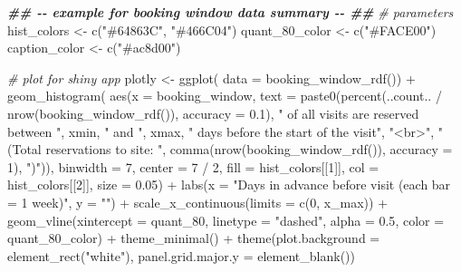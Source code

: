 \documentclass[
  11 pt,
  openany]{book}
\newenvironment{Shaded}{\begin{snugshade}}{\end{snugshade}}
\newcommand{\AttributeTok}[1]{\textcolor[rgb]{0.77,0.63,0.00}{#1}}
\newcommand{\CommentTok}[1]{\textcolor[rgb]{0.56,0.35,0.01}{\textit{#1}}}
\newcommand{\DecValTok}[1]{\textcolor[rgb]{0.00,0.00,0.81}{#1}}
\newcommand{\DocumentationTok}[1]{\textcolor[rgb]{0.56,0.35,0.01}{\textbf{\textit{#1}}}}
\newcommand{\FloatTok}[1]{\textcolor[rgb]{0.00,0.00,0.81}{#1}}
\newcommand{\FunctionTok}[1]{\textcolor[rgb]{0.00,0.00,0.00}{#1}}
\newcommand{\NormalTok}[1]{#1}
\newcommand{\OtherTok}[1]{\textcolor[rgb]{0.56,0.35,0.01}{#1}}
\newcommand{\SpecialCharTok}[1]{\textcolor[rgb]{0.00,0.00,0.00}{#1}}
\newcommand{\StringTok}[1]{\textcolor[rgb]{0.31,0.60,0.02}{#1}}
\begin{document}
\begin{Shaded}
\begin{Highlighting}[]
\DocumentationTok{\#\# {-}{-} example for booking window data summary {-}{-} \#\#}
\CommentTok{\# parameters}
\NormalTok{hist\_colors }\OtherTok{\textless{}{-}} \FunctionTok{c}\NormalTok{(}\StringTok{"\#64863C"}\NormalTok{, }\StringTok{"\#466C04"}\NormalTok{)}
\NormalTok{quant\_80\_color }\OtherTok{\textless{}{-}} \FunctionTok{c}\NormalTok{(}\StringTok{"\#FACE00"}\NormalTok{)}
\NormalTok{caption\_color }\OtherTok{\textless{}{-}} \FunctionTok{c}\NormalTok{(}\StringTok{"\#ac8d00"}\NormalTok{)}

\CommentTok{\# plot for shiny app}
\NormalTok{plotly }\OtherTok{\textless{}{-}} \FunctionTok{ggplot}\NormalTok{(}
  \AttributeTok{data =} \FunctionTok{booking\_window\_rdf}\NormalTok{()) }\SpecialCharTok{+}
  \FunctionTok{geom\_histogram}\NormalTok{(}
    \FunctionTok{aes}\NormalTok{(}\AttributeTok{x =}\NormalTok{ booking\_window,}
        \AttributeTok{text =} \FunctionTok{paste0}\NormalTok{(}\FunctionTok{percent}\NormalTok{(..count.. }\SpecialCharTok{/} \FunctionTok{nrow}\NormalTok{(}\FunctionTok{booking\_window\_rdf}\NormalTok{()), }
                              \AttributeTok{accuracy =} \FloatTok{0.1}\NormalTok{), }
                      \StringTok{" of all visits are reserved between "}\NormalTok{, xmin, }
                      \StringTok{" and "}\NormalTok{, xmax, }
                      \StringTok{" days before the start of the visit"}\NormalTok{, }
                      \StringTok{"\textless{}br\textgreater{}"}\NormalTok{,}
                      \StringTok{"(Total reservations to site: "}\NormalTok{,}
                      \FunctionTok{comma}\NormalTok{(}\FunctionTok{nrow}\NormalTok{(}\FunctionTok{booking\_window\_rdf}\NormalTok{()), }\AttributeTok{accuracy =} \DecValTok{1}\NormalTok{), }
                      \StringTok{")"}\NormalTok{)),}
    \AttributeTok{binwidth =} \DecValTok{7}\NormalTok{,}
    \AttributeTok{center =} \DecValTok{7} \SpecialCharTok{/} \DecValTok{2}\NormalTok{,}
    \AttributeTok{fill =}\NormalTok{ hist\_colors[[}\DecValTok{1}\NormalTok{]], }
    \AttributeTok{col =}\NormalTok{ hist\_colors[[}\DecValTok{2}\NormalTok{]], }\AttributeTok{size =} \FloatTok{0.05}\NormalTok{) }\SpecialCharTok{+}
  \FunctionTok{labs}\NormalTok{(}\AttributeTok{x =} \StringTok{"Days in advance before visit (each bar = 1 week)"}\NormalTok{,}
       \AttributeTok{y =} \StringTok{""}\NormalTok{) }\SpecialCharTok{+}
  \FunctionTok{scale\_x\_continuous}\NormalTok{(}\AttributeTok{limits =} \FunctionTok{c}\NormalTok{(}\DecValTok{0}\NormalTok{, x\_max)) }\SpecialCharTok{+}
  \FunctionTok{geom\_vline}\NormalTok{(}\AttributeTok{xintercept =}\NormalTok{ quant\_80,}
             \AttributeTok{linetype =} \StringTok{"dashed"}\NormalTok{, }\AttributeTok{alpha =} \FloatTok{0.5}\NormalTok{, }\AttributeTok{color =}\NormalTok{ quant\_80\_color) }\SpecialCharTok{+}
  \FunctionTok{theme\_minimal}\NormalTok{() }\SpecialCharTok{+}
  \FunctionTok{theme}\NormalTok{(}\AttributeTok{plot.background =} \FunctionTok{element\_rect}\NormalTok{(}\StringTok{"white"}\NormalTok{),}
        \AttributeTok{panel.grid.major.y =} \FunctionTok{element\_blank}\NormalTok{())}


\end{Highlighting}
\end{Shaded}
\end{document}
